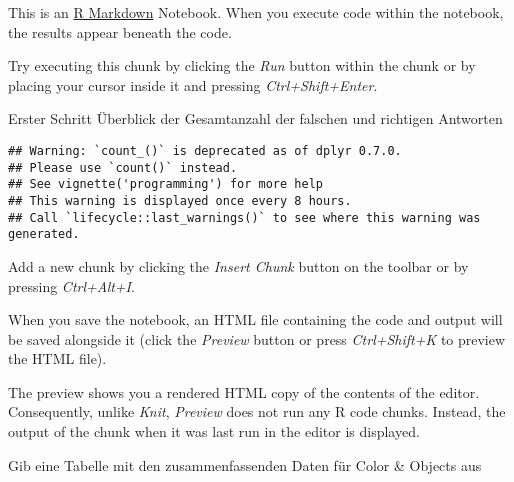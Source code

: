\documentclass[
]{article}
\newenvironment{Shaded}{\begin{snugshade}}{\end{snugshade}}
\newcommand{\DataTypeTok}[1]{\textcolor[rgb]{0.13,0.29,0.53}{#1}}
\newcommand{\DecValTok}[1]{\textcolor[rgb]{0.00,0.00,0.81}{#1}}
\newcommand{\KeywordTok}[1]{\textcolor[rgb]{0.13,0.29,0.53}{\textbf{#1}}}
\newcommand{\NormalTok}[1]{#1}
\newcommand{\OperatorTok}[1]{\textcolor[rgb]{0.81,0.36,0.00}{\textbf{#1}}}
\newcommand{\StringTok}[1]{\textcolor[rgb]{0.31,0.60,0.02}{#1}}
\begin{document}
This is an \href{http://rmarkdown.rstudio.com}{R Markdown} Notebook.
When you execute code within the notebook, the results appear beneath
the code.

Try executing this chunk by clicking the \emph{Run} button within the
chunk or by placing your cursor inside it and pressing
\emph{Ctrl+Shift+Enter}.

Erster Schritt Überblick der Gesamtanzahl der falschen und richtigen
Antworten

\begin{verbatim}
## Warning: `count_()` is deprecated as of dplyr 0.7.0.
## Please use `count()` instead.
## See vignette('programming') for more help
## This warning is displayed once every 8 hours.
## Call `lifecycle::last_warnings()` to see where this warning was generated.
\end{verbatim}

Add a new chunk by clicking the \emph{Insert Chunk} button on the
toolbar or by pressing \emph{Ctrl+Alt+I}.

When you save the notebook, an HTML file containing the code and output
will be saved alongside it (click the \emph{Preview} button or press
\emph{Ctrl+Shift+K} to preview the HTML file).

The preview shows you a rendered HTML copy of the contents of the
editor. Consequently, unlike \emph{Knit}, \emph{Preview} does not run
any R code chunks. Instead, the output of the chunk when it was last run
in the editor is displayed.

Gib eine Tabelle mit den zusammenfassenden Daten für Color \& Objects
aus

\begin{Shaded}
\end{Shaded}
\end{document}
